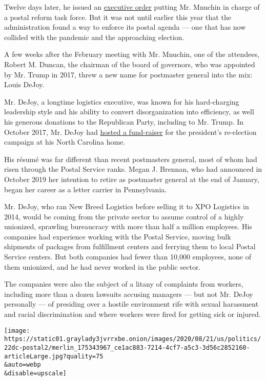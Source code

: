 Twelve days later, he issued an
\href{https://www.whitehouse.gov/presidential-actions/executive-order-task-force-united-states-postal-system/}{executive
order} putting Mr. Mnuchin in charge of a postal reform task force. But
it was not until earlier this year that the administration found a way
to enforce its postal agenda --- one that has now collided with the
pandemic and the approaching election.

A few weeks after the February meeting with Mr. Mnuchin, one of the
attendees, Robert M. Duncan, the chairman of the board of governors, who
was appointed by Mr. Trump in 2017, threw a new name for postmaster
general into the mix: Louis DeJoy.

Mr. DeJoy, a longtime logistics executive, was known for his
hard-charging leadership style and his ability to convert
disorganization into efficiency, as well his generous donations to the
Republican Party, including to Mr. Trump. In October 2017, Mr. DeJoy had
\href{https://www.newsobserver.com/article176825156.html}{hosted a
fund-raiser} for the president's re-election campaign at his North
Carolina home.

His résumé was far different than recent postmasters general, most of
whom had risen through the Postal Service ranks. Megan J. Brennan, who
had announced in October 2019 her intention to retire as postmaster
general at the end of January, began her career as a letter carrier in
Pennsylvania.

Mr. DeJoy, who ran New Breed Logistics before selling it to XPO
Logistics in 2014, would be coming from the private sector to assume
control of a highly unionized, sprawling bureaucracy with more than half
a million employees. His companies had experience working with the
Postal Service, moving bulk shipments of packages from fulfillment
centers and ferrying them to local Postal Service centers. But both
companies had fewer than 10,000 employees, none of them unionized, and
he had never worked in the public sector.

The companies were also the subject of a litany of complaints from
workers, including more than a dozen lawsuits accusing managers --- but
not Mr. DeJoy personally --- of presiding over a hostile environment
rife with sexual harassment and racial discrimination and where workers
were fired for getting sick or injured.

\texttt{[image: https://static01.graylady3jvrrxbe.onion/images/2020/08/21/us/politics/22dc-postal2/merlin\_175343967\_ce1ac883-7214-4cf7-a5c3-3d56c2852160-articleLarge.jpg?quality=75\\\&auto=webp\\\&disable=upscale]}

